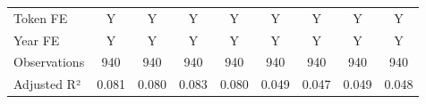 {\begin{tabular}{l*{8}{c}}
\midrule
Token FE            &           Y         &           Y         &           Y         &           Y         &           Y         &           Y         &           Y         &           Y         \\
Year FE             &           Y         &           Y         &           Y         &           Y         &           Y         &           Y         &           Y         &           Y         \\
Observations        &         940         &         940         &         940         &         940         &         940         &         940         &         940         &         940         \\
Adjusted R²         &       0.081         &       0.080         &       0.083         &       0.080         &       0.049         &       0.047         &       0.049         &       0.048         \\
\bottomrule
\end{tabular}
}
